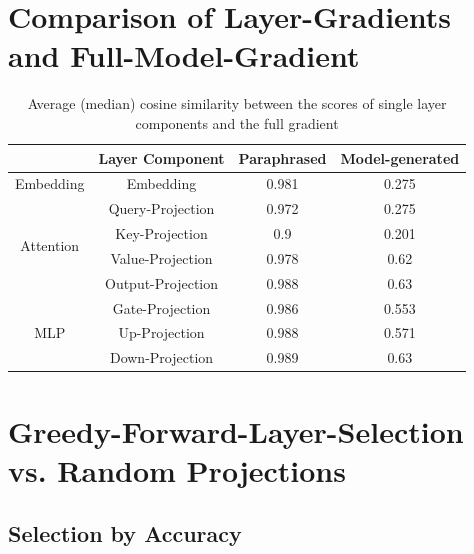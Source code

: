 
\section{Comparison of Layer-Gradients and Full-Model-Gradient}

\begin{table}[htb]
    \centering
    \begin{tabular}{|c|c|c|c|}
        \hline
        & \textbf{Layer Component} & \textbf{Paraphrased} & \textbf{Model-generated} \\
        \hline
        \multirow{1}{5em}{Embedding}
        & Embedding & 0.981 & 0.275 \\
        \hline
        \multirow{4}{5em}{Attention}
        & Query-Projection & 0.972 & 0.275 \\
        & Key-Projection & 0.9 & 0.201 \\
        & Value-Projection & 0.978 & 0.62 \\
        & Output-Projection & 0.988 & 0.63 \\
        \hline
        \multirow{3}{5em}{MLP}
        & Gate-Projection & 0.986 & 0.553 \\
        & Up-Projection & 0.988 & 0.571 \\
        & Down-Projection & 0.989 & 0.63 \\
        \hline
    \end{tabular}
    \caption{Average (median) cosine similarity between the scores of single layer components and the full gradient}
    \label{tab:average_cosine_similarity_full_gradient_comparison}
\end{table}

\section{Greedy-Forward-Layer-Selection vs. Random Projections}

\subsection{Selection by Accuracy}

